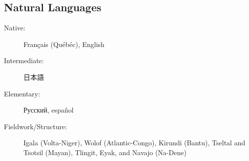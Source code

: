 \documentclass[margin,line]{resume}
\begin{document}
\begin{resume}


	\vspace{-0.9em}

	\section{\mysidestyle Natural Languages}\vspace{2mm}
	\begin{description}
		\item[Native:] Français (Qu\'{e}b\'{e}c), English
		\item[Intermediate:] \begin{CJK}{UTF8}{min}日本語\end{CJK}
		\item[Elementary:] Русский, español
		\item[Fieldwork/Structure:] Igala (Volta-Niger), Wolof (Atlantic-Congo), Kirundi (Bantu),
		      Tseltal and Tsotsil (Mayan), Tlingit, Eyak, and Navajo (Na-Dene)%
	\end{description}

	\BgThispage

\end{resume}
\end{document}
